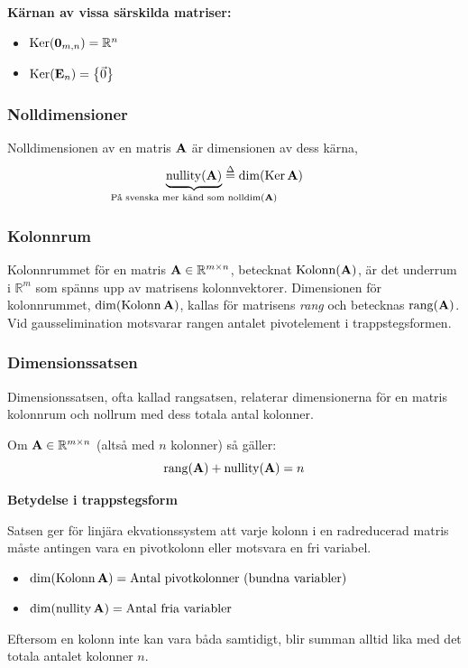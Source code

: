 \begin{ber}
	\textbf{Kärnan av vissa särskilda matriser:}

	\begin{itemize}
		\item $\operatorname{Ker}(\mathbf{0}_{m,n})=\mathbb{R}^n$
		\item $\operatorname{Ker}(\mathbf{E}_n)=\qty{\vec{0}}$
	\end{itemize}
\end{ber}

\subsubsection{Nolldimensioner}
Nolldimensionen av en matris $\mathbf{A}$ är dimensionen av dess kärna,
$$
	\underbrace{\nullity(\matr{A})}_\text{\text{\makebox[0pt]{På svenska mer känd som $\nolldim(\matr{A})$}}}\defeq\dim(\ker\matr{A})
$$

\subsubsection{Kolonnrum}\label{s:matris:kolonnrum}
Kolonnrummet för en matris $\mathbf{A}\in\mathbb{R}^{m\times n}$, betecknat $\operatorname{Kolonn}(\mathbf{A})$,
är det underrum i $\mathbb{R}^m$ som spänns upp av matrisens kolonnvektorer. Dimensionen
för kolonnrummet, $\dim(\operatorname{Kolonn}\mathbf{A})$, kallas för matrisens \emph{rang} och betecknas
$\operatorname{rang}(\mathbf{A})$. Vid gausselimination motsvarar rangen antalet pivotelement
i trappstegsformen.

\subsubsection{Dimensionssatsen}\label{s:matris:dimensionssatsen}
Dimensionssatsen, ofta kallad rangsatsen, relaterar dimensionerna för en matris
kolonnrum och nollrum med dess totala antal kolonner.

Om $\mathbf{A}\in\mathbb{R}^{m\times n}$ (altså med $n$ kolonner) så gäller:
$$
	\operatorname{rang}(\mathbf{A})+\operatorname{nullity}(\mathbf{A})=n
$$

\begin{features}
	\textbf{Betydelse i trappstegsform}
	
	Satsen ger för linjära ekvationssystem att varje kolonn i en radreducerad
	matris måste antingen vara en pivotkolonn eller motsvara en fri variabel.
	\begin{itemize}
		\item $\dim(\operatorname{Kolonn}\mathbf{A}) = \text{Antal pivotkolonner (bundna variabler)}$
		\item $\dim(\operatorname{nullity}\mathbf{A}) = \text{Antal fria variabler}$
	\end{itemize}
	Eftersom en kolonn inte kan vara båda samtidigt, blir summan alltid lika med
	det totala antalet kolonner $n$.
\end{features}

